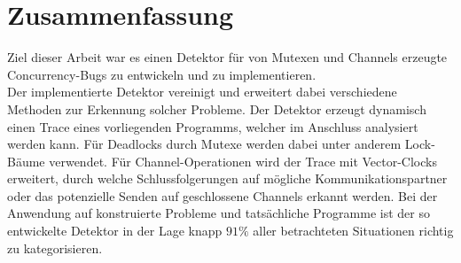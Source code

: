 \chapter{Zusammenfassung}\label{chap:conclusion}
Ziel dieser Arbeit war es einen Detektor für von Mutexen 
und Channels erzeugte Concurrency-Bugs zu entwickeln und zu implementieren.\\
Der implementierte Detektor vereinigt und erweitert dabei verschiedene Methoden 
zur Erkennung solcher Probleme. Der Detektor erzeugt dynamisch einen Trace 
eines vorliegenden Programms, welcher im Anschluss analysiert werden kann.
Für Deadlocks durch Mutexe werden dabei unter anderem Lock-Bäume verwendet. 
Für Channel-Operationen wird der Trace mit Vector-Clocks erweitert, 
durch welche Schlussfolgerungen auf mögliche Kommunikationspartner oder 
das potenzielle Senden auf geschlossene Channels erkannt werden. 
Bei der Anwendung auf konstruierte Probleme und tatsächliche Programme 
ist der so entwickelte Detektor in der Lage knapp $91\%$ aller betrachteten 
Situationen richtig zu kategorisieren. 